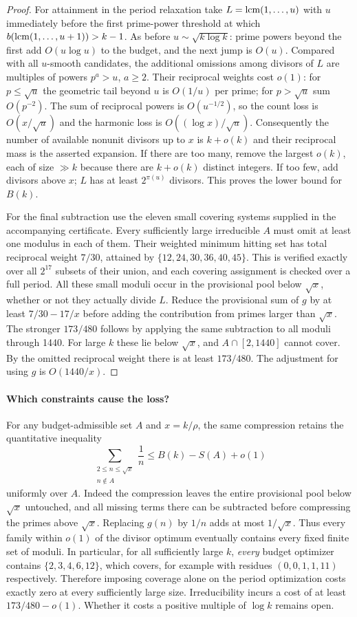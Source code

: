 \documentclass[10pt]{article}
\newcommand{\lcm}{\mathop{\rm lcm}}
\begin{document}
\begin{proof}
For attainment in the period relaxation take $L=\lcm(1,\ldots,u)$ with $u$ immediately before the first prime-power threshold at which $b(\lcm(1,\ldots,u+1))>k-1$. As before $u\sim\sqrt{k\log k}$: prime powers beyond the first add $O(u\log u)$ to the budget, and the next jump is $O(u)$. Compared with all $u$-smooth candidates, the additional omissions among divisors of $L$ are multiples of powers $p^a>u$, $a\ge2$. Their reciprocal weights cost $o(1)$: for $p\le\sqrt u$ the geometric tail beyond $u$ is $O(1/u)$ per prime; for $p>\sqrt u$ sum $O(p^{-2})$. The sum of reciprocal powers is $O(u^{-1/2})$, so the count loss is $O(x/\sqrt u)$ and the harmonic loss is $O((\log x)/\sqrt u)$. Consequently the number of available nonunit divisors up to $x$ is $k+o(k)$ and their reciprocal mass is the asserted expansion. If there are too many, remove the largest $o(k)$, each of size $\gg k$ because there are $k+o(k)$ distinct integers. If too few, add divisors above $x$; $L$ has at least $2^{\pi(u)}$ divisors. This proves the lower bound for $B(k)$.

For the final subtraction use the eleven small covering systems supplied in the accompanying certificate. Every sufficiently large irreducible $A$ must omit at least one modulus in each of them. Their weighted minimum hitting set has total reciprocal weight $7/30$, attained by $\{12,24,30,36,40,45\}$. This is verified exactly over all $2^{17}$ subsets of their union, and each covering assignment is checked over a full period. All these small moduli occur in the provisional pool below $\sqrt x$, whether or not they actually divide $L$. Reduce the provisional sum of $g$ by at least $7/30-17/x$ before adding the contribution from primes larger than $\sqrt x$. The stronger $173/480$ follows by applying the same subtraction to all moduli through 1440. For large $k$ these lie below $\sqrt x$, and $A\cap[2,1440]$ cannot cover. By \cite[Theorem 6.6]{ozturk} the omitted reciprocal weight there is at least $173/480$. The adjustment for using $g$ is $O(1440/x)$.
\end{proof}

\paragraph{Which constraints cause the loss?}
For any budget-admissible set $A$ and $x=k/\rho$, the same compression retains the quantitative inequality
\[
 \sum_{\substack{2\le n\le\sqrt{x}\\n\notin A}}\frac1n
       \le B(k)-S(A)+o(1)
\]
uniformly over $A$. Indeed the compression leaves the entire provisional pool below $\sqrt{x}$ untouched, and all missing terms there can be subtracted before compressing the primes above $\sqrt{x}$. Replacing $g(n)$ by $1/n$ adds at most $1/\sqrt x$. Thus every family within $o(1)$ of the divisor optimum eventually contains every fixed finite set of moduli. In particular, for all sufficiently large $k$, \emph{every} budget optimizer contains $\{2,3,4,6,12\}$, which covers, for example with residues $(0,0,1,1,11)$ respectively. Therefore imposing coverage alone on the period optimization costs exactly zero at every sufficiently large size. Irreducibility incurs a cost of at least $173/480-o(1)$. Whether it costs a positive multiple of $\log k$ remains open.
\end{document}
